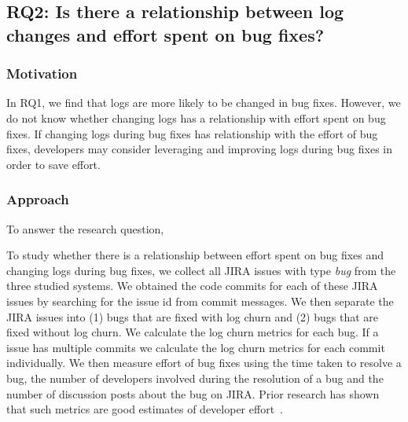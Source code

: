 \subsection*{RQ2: Is there a relationship between log changes and effort spent on bug fixes?}


\subsubsection*{Motivation}

In RQ1, we find that logs are more likely to be changed in bug fixes. However, we do not know whether changing logs has a relationship with effort spent on bug fixes. If changing logs during bug fixes has relationship with the effort of bug fixes, developers may consider leveraging and improving logs during bug fixes in order to save effort.

\subsubsection*{Approach}


To answer the research question, 

To study whether there is a relationship between effort spent on bug fixes and changing logs during bug fixes, we collect all JIRA issues with type \emph{bug} from the three studied systems. We obtained the code commits for each of these JIRA issues by searching for the issue id from commit messages. We then separate the JIRA issues into (1) bugs that are fixed with log churn and (2) bugs that are fixed without log churn. We calculate the log churn metrics for each bug. If a issue has multiple commits we calculate the log churn metrics for each commit individually. We then measure effort of bug fixes using the time taken to resolve a bug, the number of developers involved during the resolution of a bug and the number of discussion posts about the bug on JIRA. Prior research has shown that such metrics are good estimates of developer effort~\cite{amor2006effort}. 

